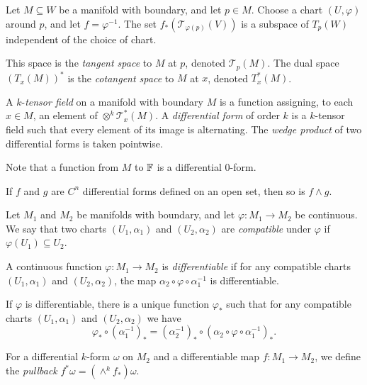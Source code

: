 \begin{prop}
    Let $M\subseteq W$ be a manifold with boundary, and let $p\in M$. Choose a chart
    $(U,\varphi)$ around $p$, and let $f=\varphi^{-1}$.
    The set $f_*(\mathcal T_{\varphi(p)}(V))$ is a subspace of $T_p(W)$
    independent of the choice of chart.
\end{prop}
\begin{defn}
    This space is the \emph{tangent space} to $M$ at $p$, denoted $\mathcal
    T_p(M)$. The dual space $(T_x(M))^*$ is the \emph{cotangent space} to $M$ at
    $x$, denoted $T_x^*(M)$.
\end{defn}
\begin{defn}
    A $k$-\emph{tensor field} on a manifold with boundary $M$ is a function assigning,
    to each $x\in M$, an element of $\otimes^k \mathcal T_x^*(M)$. A
    \emph{differential form} of order $k$ is a $k$-tensor field such that every
    element of its image is alternating. The \emph{wedge product} of two
    differential forms is taken pointwise.
\end{defn}
\begin{rem}
    Note that a function from $M$ to $\mathbb{F}$ is a differential $0$-form.
\end{rem}
\begin{prop}
    If $f$ and $g$ are $C^n$ differential forms defined on an open set, then so
    is $f\wedge g$.
\end{prop}
\begin{defn}
    Let $M_1$ and $M_2$ be manifolds with boundary, and let $\varphi:M_1\to M_2$ be
    continuous. We say that two charts $(U_1,\alpha_1)$ and $(U_2,\alpha_2)$ are
    \emph{compatible} under $\varphi$ if $\varphi(U_1)\subseteq U_2$.
\end{defn}
\begin{defn}
    A continuous function $\varphi:M_1\to M_2$ is \emph{differentiable}
    if for any compatible charts
    $(U_1,\alpha_1)$ and $(U_2,\alpha_2)$, the map
    $\alpha_2\circ\varphi\circ\alpha_1^{-1}$ is differentiable.
\end{defn}
\begin{prop}
    If $\varphi$ is differentiable, there is a unique function $\varphi_*$
    such that for any compatible charts
    $(U_1,\alpha_1)$ and $(U_2,\alpha_2)$ we have
    \[\varphi_*\circ(\alpha_1^{-1})_*=(\alpha_2^{-1})_*\circ
    (\alpha_2\circ\varphi\circ\alpha_1^{-1})_*.\]
\end{prop}
\begin{defn}
    For a differential $k$-form $\omega$ on $M_2$ and a differentiable map 
    $f:M_1\to M_2$, we define the \emph{pullback} 
    $f^*\omega=(\wedge^k f_*)\omega$.
\end{defn}

